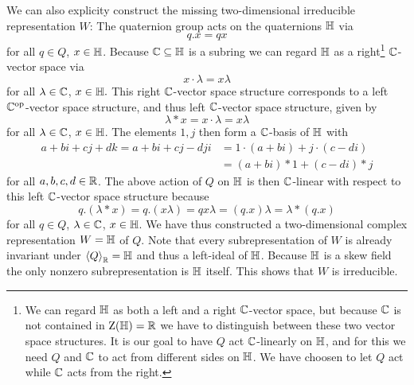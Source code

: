 \begin{example}
  We can also explicity construct the missing two-dimensional irreducible representation $W$:
  The quaternion group acts on the quaternions $\mathbb{H}$ via
  \[
      q.x
    = qx
  \]
  for all $q \in Q$, $x \in \mathbb{H}$.
  Because $\mathbb{C} \subseteq \mathbb{H}$ is a subring we can regard $\mathbb{H}$ as a right\footnote{
  We can regard $\mathbb{H}$ as both a left and a right $\mathbb{C}$-vector space, but because $\mathbb{C}$ is not contained in $\operatorname{Z}(\mathbb{H}) = \mathbb{R}$ we have to distinguish between these two vector space structures.
  It is our goal to have $Q$ act $\mathbb{C}$-linearly on $\mathbb{H}$, and for this we need $Q$ and $\mathbb{C}$ to act from different sides on $\mathbb{H}$.
  We have choosen to let $Q$ act while $\mathbb{C}$ acts from the right.
  }
  $\mathbb{C}$-vector space via
  \[
      x \cdot \lambda
    = x \lambda
  \]
  for all $\lambda \in \mathbb{C}$, $x \in \mathbb{H}.$
  This right $\mathbb{C}$-vector space structure corresponds to a left $\mathbb{C}^{\operatorname{op}}$-vector space structure, and thus left $\mathbb{C}$-vector space structure, given by
  \[
      \lambda * x
    = x \cdot \lambda
    = x \lambda
  \]
  for all $\lambda \in \mathbb{C}$, $x \in \mathbb{H}$.
  The elements $1, j$ then form a $\mathbb{C}$-basis of $\mathbb{H}$ with
  \begin{align*}
        a + bi + cj + dk
     =  a + bi + cj - dji
    &=  1 \cdot (a + bi) + j \cdot (c - di) \\
    &=  (a + bi) * 1 + (c - di) * j
  \end{align*}
  for all $a, b, c, d \in \mathbb{R}$.
  The above action of $Q$ on $\mathbb{H}$ is then $\mathbb{C}$-linear with respect to this left $\mathbb{C}$-vector space structure because
  \[
      q.(\lambda * x)
    = q.(x \lambda) 
    = q x \lambda
    = (q.x) \lambda
    = \lambda * (q.x)
  \]
  for all $q \in Q$, $\lambda \in \mathbb{C}$, $x \in \mathbb{H}$.
  We have thus constructed a two-dimensional complex representation $W = \mathbb{H}$ of $Q$.
  Note that every subrepresentation of $W$ is already invariant under $\left\langle Q \right\rangle_{\mathbb{R}} = \mathbb{H}$ and thus a left-ideal of $\mathbb{H}$.
  Because $\mathbb{H}$ is a skew field the only nonzero subrepresentation is $\mathbb{H}$ itself.
  This shows that $W$ is irreducible.
  

\end{example}
